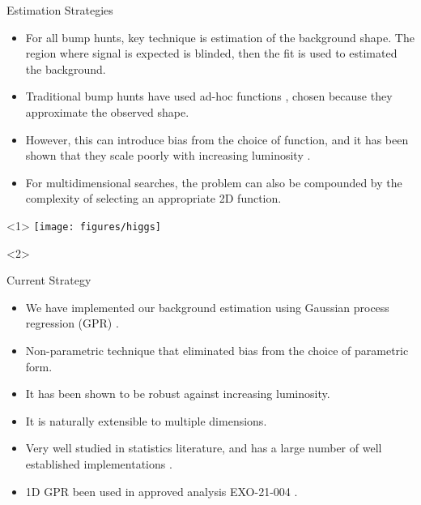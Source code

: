 \documentclass[10pt]{beamer}
\begin{document}
\begin{frame}{Estimation Strategies}
  \begin{splitcol}[0.55]
    \begin{col}
      \begin{itemize}
      \item For all bump hunts, key technique is estimation of the background shape.
        The region where signal is expected is blinded, then the fit is used to estimated the background.
      \item Traditional bump hunts have used ad-hoc functions \cite{zisopoulos_parametric_2023}, chosen because they approximate the observed shape. 
      \item However, this can introduce bias from the choice of function, and it has been shown that they scale poorly with increasing luminosity \cite{frate_modeling_2017}.
      \item For multidimensional searches, the problem can also be compounded by the complexity of selecting an appropriate 2D function.
      \end{itemize}
    \end{col}
    \begin{col}
      \begin{center}
        \begin{onlyenv}<1>
          \texttt{[image: figures/higgs]}
        \end{onlyenv}
        \begin{onlyenv}<2>
        \end{onlyenv}
      \end{center}
    \end{col}
  \end{splitcol}
\end{frame}

\begin{frame}{Current Strategy}
  \begin{itemize}
  \item We have implemented our background estimation using Gaussian process regression (GPR) \cite{rasmussen_gaussian_2006}.
  \item Non-parametric technique that eliminated bias from the choice of parametric form.
  \item It has been shown to be robust against increasing luminosity\cite{frate_modeling_2017}.
  \item It is naturally extensible to multiple dimensions.
  \item Very well studied in statistics literature\cite{rasmussen_gaussian_2006}, and has a large number of well established implementations \cite{noauthor_comparison_2024, gardner_gpytorch_2021}.
  \item 1D GPR been used in approved analysis EXO-21-004 \cite{cms_collaboration_searches_2024}.
  \end{itemize}
\end{frame}
\end{document}
